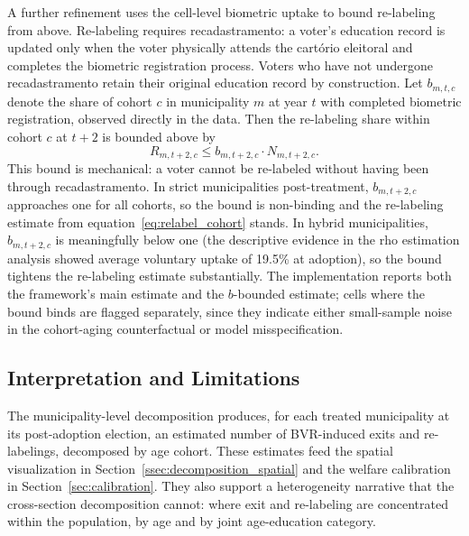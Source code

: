 A further refinement uses the cell-level biometric uptake to bound re-labeling from above. Re-labeling requires recadastramento: a voter's education record is updated only when the voter physically attends the cartório eleitoral and completes the biometric registration process. Voters who have not undergone recadastramento retain their original education record by construction. Let $b_{m,t,c}$ denote the share of cohort $c$ in municipality $m$ at year $t$ with completed biometric registration, observed directly in the data. Then the re-labeling share within cohort $c$ at $t+2$ is bounded above by
\begin{equation}
R_{m,t+2,c} \leq b_{m,t+2,c} \cdot N_{m,t+2,c}.
\label{eq:relabel_pctbvr_bound}
\end{equation}
This bound is mechanical: a voter cannot be re-labeled without having been through recadastramento. In strict municipalities post-treatment, $b_{m,t+2,c}$ approaches one for all cohorts, so the bound is non-binding and the re-labeling estimate from equation~\eqref{eq:relabel_cohort} stands. In hybrid municipalities, $b_{m,t+2,c}$ is meaningfully below one (the descriptive evidence in the rho estimation analysis showed average voluntary uptake of 19.5\% at adoption), so the bound tightens the re-labeling estimate substantially. The implementation reports both the framework's main estimate and the $b$-bounded estimate; cells where the bound binds are flagged separately, since they indicate either small-sample noise in the cohort-aging counterfactual or model misspecification.

\subsection{Interpretation and Limitations}
\label{ssec:decomposition_mun_interp}

The municipality-level decomposition produces, for each treated municipality at its post-adoption election, an estimated number of BVR-induced exits and re-labelings, decomposed by age cohort. These estimates feed the spatial visualization in Section~\ref{ssec:decomposition_spatial} and the welfare calibration in Section~\ref{sec:calibration}. They also support a heterogeneity narrative that the cross-section decomposition cannot: where exit and re-labeling are concentrated within the population, by age and by joint age-education category.

